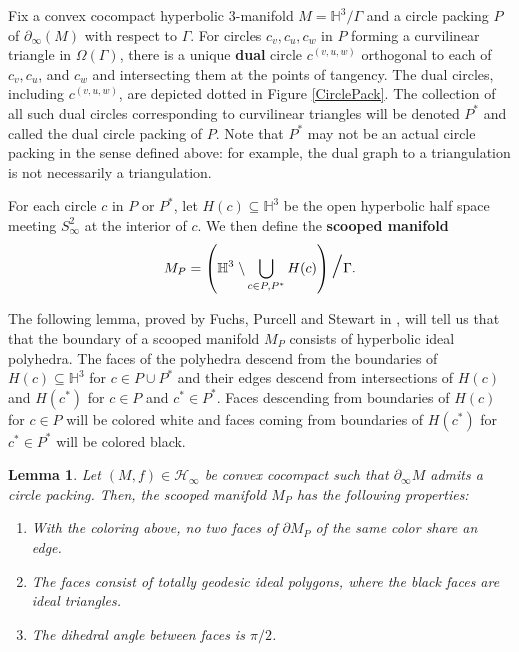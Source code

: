 \documentclass[11pt,leqno]{article}
\newtheorem{lemma}{Lemma}
\theoremstyle{introdef}
\numberwithin{lemma}{section}
\theoremstyle{definition}
\begin{document}
Fix a convex cocompact hyperbolic $3$-manifold $M=\mathbb{H}^3/\Gamma$ and a circle packing $P$ of $\partial_\infty(M)$ with respect to $\Gamma$. For circles $c_v,c_u,c_w$ in $P$ forming a curvilinear triangle in $\Omega(\Gamma)$, there is a unique \textbf{dual} circle $c^{(v,u,w)}$ orthogonal to each of $c_v,c_u$, and $c_w$ and intersecting them at the points of tangency. The dual circles, including $c^{(v,u,w)}$, are depicted dotted in Figure \ref{CirclePack}. The collection of all such dual circles corresponding to curvilinear triangles will be denoted $P^*$ and called the dual circle packing of $P$. Note that $P^*$ may not be an actual circle packing in the sense defined above: for example, the dual graph to a triangulation is not necessarily a triangulation.\par

For each circle $c$ in $P$ or $P^*$, let $H(c)\subseteq\mathbb{H}^3$ be the open hyperbolic half space meeting $S^2_\infty$ at the interior of $c$. We then define the \textbf{scooped manifold} \[M_P=\left(\mathbb{H}^3\;\backslash\bigcup_{c\in P,P^*}H(c)\right)\mathlarger{\mathlarger{\mathlarger{/}}}\Gamma.\]\par


The following lemma, proved by Fuchs, Purcell and Stewart in \cite[Prop 3.3]{PUR}, will tell us that that the boundary of a scooped manifold $M_P$ consists of hyperbolic ideal polyhedra. The faces of the polyhedra descend from the boundaries of $H(c)\subseteq\mathbb{H}^3$ for $c\in P\cup P^*$ and their edges descend from intersections of $H(c)$ and $H(c^*)$ for $c\in P$ and $c^*\in P^*$. Faces descending from boundaries of $H(c)$ for $c\in P$ will be colored white and faces coming from boundaries of $H(c^*)$ for $c^*\in P^*$ will be colored black. \par

\begin{lemma}
\label{scoopbound}
    Let $(M,f)\in\mathcal{H}_\infty$ be convex cocompact such that $\partial_\infty M$ admits a circle packing. Then, the scooped manifold $M_P$ has the following properties:
    \begin{enumerate}
        \item With the coloring above, no two faces of $\partial M_P$ of the same color share an edge. 
        \item The faces consist of totally geodesic ideal polygons, where the black faces are ideal triangles.
        \item The dihedral angle between faces is $\pi/2$.
    \end{enumerate}
\end{lemma}
\end{document}
